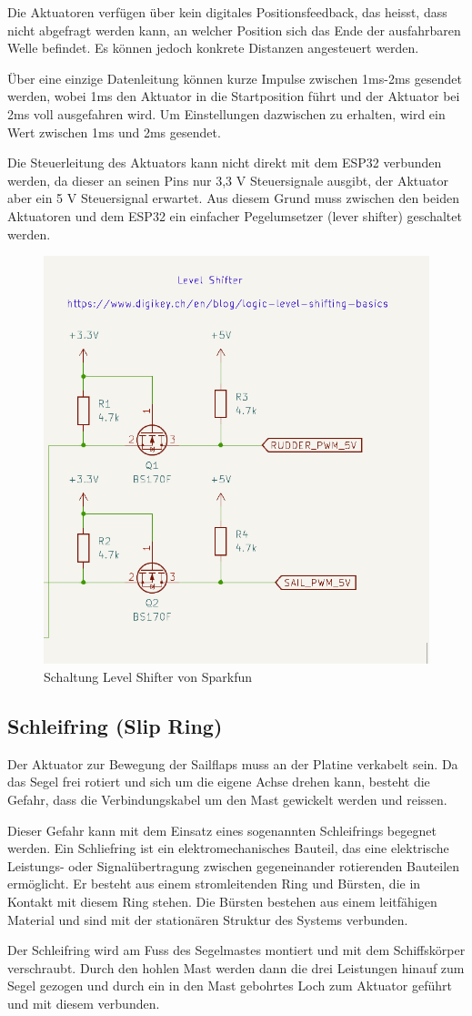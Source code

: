 Die Aktuatoren verfügen über kein digitales Positionsfeedback, das heisst, dass nicht abgefragt werden kann, an welcher Position sich das Ende der ausfahrbaren Welle befindet. Es können jedoch konkrete Distanzen angesteuert werden. 

Über eine einzige Datenleitung können kurze Impulse zwischen 1ms-2ms gesendet werden, wobei 1ms den Aktuator in die Startposition führt und der Aktuator bei 2ms voll ausgefahren wird. Um Einstellungen dazwischen zu erhalten, wird ein Wert zwischen 1ms und 2ms gesendet. 

Die Steuerleitung des Aktuators kann nicht direkt mit dem ESP32 verbunden werden, da dieser an seinen Pins nur 3,3 V Steuersignale ausgibt, der Aktuator aber ein 5 V Steuersignal erwartet. Aus diesem Grund muss zwischen den beiden Aktuatoren und dem ESP32 ein einfacher Pegelumsetzer (lever shifter) geschaltet werden. 
\begin{figure}[H]
    \centering
    \includegraphics[width=0.5\linewidth]{assets/lvelshift.png}
    \caption{Schaltung Level Shifter von Sparkfun}
    \label{fig:enter-label}
\end{figure}

\subsection{Schleifring (Slip Ring)}
Der Aktuator zur Bewegung der Sailflaps muss an der Platine verkabelt sein. Da das Segel frei rotiert und sich um die eigene Achse drehen kann, besteht die Gefahr, dass die Verbindungskabel um den Mast gewickelt werden und reissen.

Dieser Gefahr kann mit dem Einsatz eines sogenannten Schleifrings begegnet werden.  Ein Schliefring ist ein elektromechanisches Bauteil, das eine elektrische Leistungs- oder Signalübertragung zwischen gegeneinander rotierenden Bauteilen ermöglicht. Er besteht aus einem stromleitenden Ring und Bürsten, die in Kontakt mit diesem Ring stehen. Die Bürsten bestehen aus einem leitfähigen Material und sind mit der stationären Struktur des Systems verbunden. 

Der Schleifring wird am Fuss des Segelmastes montiert und mit dem Schiffskörper verschraubt. Durch den hohlen Mast werden dann die drei Leistungen hinauf zum Segel gezogen und durch ein in den Mast gebohrtes Loch zum Aktuator geführt und mit diesem verbunden.

















